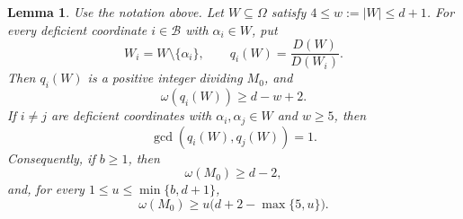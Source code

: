 \documentclass[11pt,onecolumn]{IEEEtran}
\newtheorem{lemma}{Lemma}
\begin{document}
\begin{lemma}
\label{lem:shared-prime-separation}
Use the notation above.  Let $W\subseteq\Omega$ satisfy
$4\le w:=|W|\le d+1$.  For every deficient coordinate
$i\in\mathcal B$ with $\alpha_i\in W$, put
\[
W_i=W\setminus\{\alpha_i\},
\qquad
q_i(W)=\frac{D(W)}{D(W_i)}.
\]
Then $q_i(W)$ is a positive integer dividing $M_0$, and
\begin{equation}
\omega(q_i(W))\ge d-w+2.
\label{eq:shared-prime-count}
\end{equation}
If $i\ne j$ are deficient coordinates with
$\alpha_i,\alpha_j\in W$ and $w\ge5$, then
\[
\gcd(q_i(W),q_j(W))=1.
\]
Consequently, if $b\ge1$, then
\begin{equation}
\omega(M_0)\ge d-2,
\label{eq:shared-singleton-support}
\end{equation}
and, for every $1\le u\le\min\{b,d+1\}$,
\begin{equation}
\omega(M_0)
\ge u\bigl(d+2-\max\{5,u\}\bigr).
\label{eq:shared-multiple-support}
\end{equation}
\end{lemma}
\end{document}
